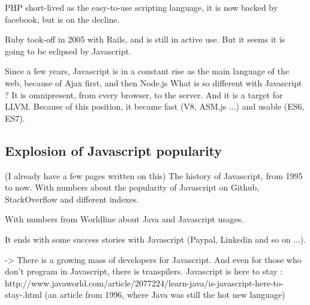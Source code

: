 \documentclass[12pt]{report}
\begin{document}
      PHP short-lived as the easy-to-use scripting language, it is now backed by facebook, but is on the decline.

      Ruby took-off in 2005 with Rails, and is still in active use.
      But it seems it is going to be eclipsed by Javascript.

      Since a few years, Javascript is in a constant rise as the main language of the web, because of Ajax first, and then Node.js
      What is so different with Javascript ?
      It is omnipresent, from every browser, to the server.
      And it is a target for LLVM.
      Because of this position, it became fast (V8, ASM.js ...) and usable (ES6, ES7).

    \subsection{Explosion of Javascript popularity}
   
      (I already have a few pages written on this)
      The history of Javascript, from 1995 to now.
      With numbers about the popularity of Javascript on Github, StackOverflow and different indexes.

      With numbers from Worldline about Java and Javascript usages.

      It ends with some success stories with Javascript (Paypal, Linkedin and so on ...).

      -> There is a growing mass of developers for Javascript.
      And even for those who don't program in Javascript, there is transpilers.
      Javascript is here to stay : http://www.javaworld.com/article/2077224/learn-java/is-javascript-here-to-stay-.html (an article from 1996, where Java was still the hot new language)
\end{document}
